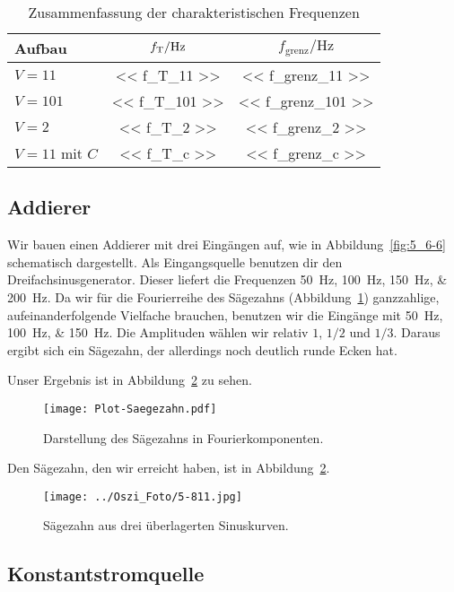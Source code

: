 \begin{table}[htbp]
	\centering
	\begin{tabular}{lSS}
		{Aufbau} &
		{$\fT / \si\hertz$} &
		{$f_\text{grenz} / \si\hertz$} \\
		\hline
		$V = 11$ & << f_T_11 >> & << f_grenz_11 >> \\
		$V = 101$ & << f_T_101 >> & << f_grenz_101 >> \\
		$V = 2$ & << f_T_2 >> & << f_grenz_2 >> \\
		$V = 11$ mit $C$ & << f_T_c >> & << f_grenz_c >> \\
	\end{tabular}
	\caption{%
		Zusammenfassung der charakteristischen Frequenzen
	}
	\label{tab:Verstaerker-Zusammenfassung}
\end{table}

\FloatBarrier
\subsection{Addierer}

Wir bauen einen Addierer mit drei Eingängen auf, wie in
Abbildung~\ref{fig:5_6-6} schematisch dargestellt. Als Eingangsquelle benutzen
dir den Dreifachsinusgenerator. Dieser liefert die Frequenzen
\SIlist{50;100;150;200}{\hertz}. Da wir für die Fourierreihe des Sägezahns
(Abbildung~\ref{fig:saegezahn}) ganzzahlige, aufeinanderfolgende Vielfache
brauchen, benutzen wir die Eingänge mit \SIlist{50;100;150}{\hertz}. Die
Amplituden wählen wir relativ $1$, $1/2$ und $1/3$. Daraus ergibt sich ein
Sägezahn, der allerdings noch deutlich runde Ecken hat.

Unser Ergebnis ist in Abbildung~\ref{fig:811} zu sehen.

\begin{figure}[htbp]
	\centering
	\texttt{[image: Plot-Saegezahn.pdf]}
	\caption{%
		Darstellung des Sägezahns in Fourierkomponenten.
	}
	\label{fig:saegezahn}
\end{figure}

Den Sägezahn, den wir erreicht haben, ist in Abbildung~\ref{fig:811}.

\begin{figure}[htbp]
	\centering
	\texttt{[image: ../Oszi\_Foto/5-811.jpg]}
	\caption{%
        Sägezahn aus drei überlagerten Sinuskurven.
	}
	\label{fig:811}
\end{figure}

\FloatBarrier
\subsection{Konstantstromquelle}

